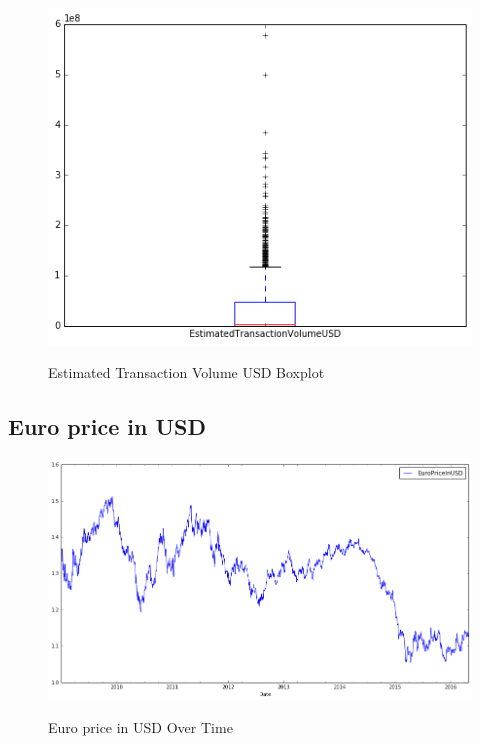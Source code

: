 \begin{figure}[bth]
  \myfloatalign
  {\includegraphics[width=1\linewidth]
    {gfx/estimated-transaction-volume-usd-boxplot}}
  \caption{Estimated Transaction Volume USD Boxplot}
  \label{fig:estimated-transaction-volume-usd-boxplot}
\end{figure}

\clearpage


\subsection{Euro price in USD}
\label{sec:euro-price-in-usd}

\begin{figure}[bth]
  \myfloatalign
  {\includegraphics[width=1\linewidth]
    {gfx/euro-price-in-usd-over-time}} 
  \caption{Euro price in USD Over Time}
  \label{fig:euro-price-in-usd-over-time}
\end{figure}

